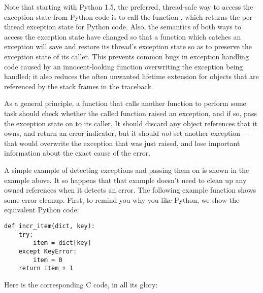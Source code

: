 \documentclass{manual}
\begin{document}
Note that starting with Python 1.5, the preferred, thread-safe way to 
access the exception state from Python code is to call the function
, which returns the per-thread exception state 
for Python code.  Also, the semantics of both ways to access the 
exception state have changed so that a function which catches an 
exception will save and restore its thread's exception state so as to 
preserve the exception state of its caller.  This prevents common bugs 
in exception handling code caused by an innocent-looking function 
overwriting the exception being handled; it also reduces the often 
unwanted lifetime extension for objects that are referenced by the 
stack frames in the traceback.

As a general principle, a function that calls another function to 
perform some task should check whether the called function raised an 
exception, and if so, pass the exception state on to its caller.  It 
should discard any object references that it owns, and return an 
error indicator, but it should \emph{not} set another exception ---
that would overwrite the exception that was just raised, and lose
important information about the exact cause of the error.

A simple example of detecting exceptions and passing them on is shown
in the  example
above.  It so happens that that example doesn't need to clean up any
owned references when it detects an error.  The following example
function shows some error cleanup.  First, to remind you why you like
Python, we show the equivalent Python code:

\begin{verbatim}
def incr_item(dict, key):
    try:
        item = dict[key]
    except KeyError:
        item = 0
    return item + 1
\end{verbatim}

Here is the corresponding C code, in all its glory:
\end{document}
